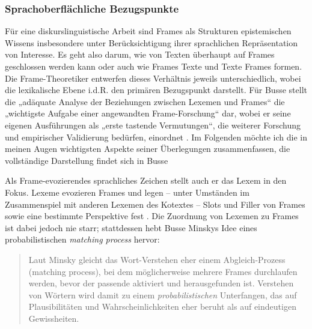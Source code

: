 \subsubsection{Sprachoberflächliche Bezugspunkte}\label{sprachoberflaechliche-bezugspunkte}
\largerpage
Für eine diskurslinguistische Arbeit sind Frames als Strukturen epistemischen Wissens insbesondere unter Berücksichtigung ihrer sprachlichen Repräsentation von Interesse. Es geht also darum, wie von Texten überhaupt auf Frames geschlossen werden kann oder auch wie Frames Texte und Texte Frames formen. Die Frame-Theoretiker entwerfen dieses Verhältnis jeweils unterschiedlich, wobei die lexikalische Ebene i.d.R. den primären Bezugspunkt darstellt. Für Busse stellt die „adäquate Analyse der Beziehungen zwischen Lexemen und Frames`` die „wichtigste Aufgabe einer angewandten Frame-Forschung`` dar, wobei er seine eigenen Ausführungen als „erste tastende Vermutungen``, die weiterer Forschung und empirischer Validierung bedürfen, einordnet \autocite*[656]{busseFrameSemantikKompendium2012}. Im Folgenden möchte ich die in meinen Augen wichtigsten Aspekte seiner Überlegungen zusammenfassen, die vollständige Darstellung findet sich in Busse \autocite*[652-658 insb.]{busseFrameSemantikKompendium2012}

Als Frame-evozierendes sprachliches Zeichen stellt auch er das Lexem in den Fokus. Lexeme evozieren Frames und legen -- unter Umständen im Zusammenspiel mit anderen Lexemen des Kotextes -- Slots und Filler von Frames sowie eine bestimmte Perspektive fest \autocite[656-657]{busseFrameSemantikKompendium2012}. Die Zuordnung von Lexemen zu Frames ist dabei jedoch nie starr; stattdessen hebt Busse Minskys Idee eines probabilistischen \emph{matching process} hervor:

\begin{quote}
Laut Minsky gleicht das Wort-Verstehen eher einem Abgleich-Prozess (matching process), bei dem möglicherweise mehrere Frames durchlaufen werden, bevor der passende aktiviert und herausgefunden ist. Verstehen von Wörtern wird damit zu einem \emph{probabilistischen} Unterfangen, das auf Plausibilitäten und Wahrscheinlichkeiten eher beruht als auf eindeutigen Gewissheiten. \autocite[653]{busseFrameSemantikKompendium2012}
\end{quote}

